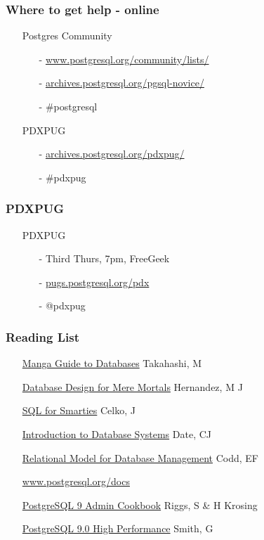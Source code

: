 \documentclass[20pt]{beamer}
\begin{document}
\frame
{
    \frametitle{Where to get help - online}
    \begin{itemize}
    \item[] Postgres Community
        \begin{itemize}
        \item[-] \url{www.postgresql.org/community/lists/}
        \item[-] \url{archives.postgresql.org/pgsql-novice/}
        \item[-] \#postgresql
        \end{itemize}
    \item[] PDXPUG
        \begin{itemize}
            \item[-] \url{archives.postgresql.org/pdxpug/}
            \item[-] \#pdxpug
        \end{itemize}
    \end{itemize}
}

\frame
{
    \frametitle{PDXPUG}
    \begin{itemize}
    \item[] PDXPUG
	    \begin{itemize}
	    \item[-] Third Thurs, 7pm, FreeGeek
	    \item[-] \url{pugs.postgresql.org/pdx}
	    \item[-] @pdxpug
	    \end{itemize}
    \end{itemize}
}

\frame
{
    \frametitle{Reading List}
    \begin{itemize}
    \item[] \underline{Manga Guide to Databases} Takahashi, M
    \item[] \underline{Database Design for Mere Mortals} Hernandez, M J
    \item[] \underline{SQL for Smarties} Celko, J
    \item[] \underline{Introduction to Database Systems} Date, CJ
    \item[] \underline{Relational Model for Database Management} Codd, EF
    \item[] \url{www.postgresql.org/docs}
    \item[] \underline{PostgreSQL 9 Admin Cookbook} Riggs, S \& H Krosing
    \item[] \underline{PostgreSQL 9.0 High Performance} Smith, G
    \end{itemize}
}

\end{document}
